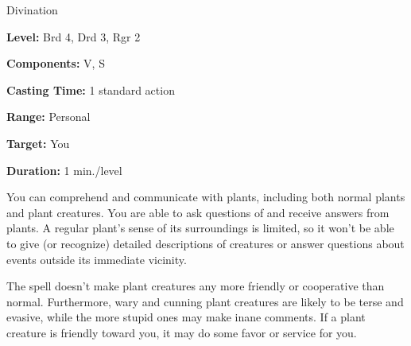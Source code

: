 
Divination

\textbf{Level:} Brd 4, Drd 3, Rgr 2

\textbf{Components:} V, S

\textbf{Casting Time:} 1 standard action

\textbf{Range:} Personal

\textbf{Target:} You

\textbf{Duration:} 1 min./level

You can comprehend and communicate with plants, including both normal plants and 
plant creatures. You are able to ask questions of and receive answers from plants. 
A regular plant's sense of its surroundings is limited, so it won't be able to 
give (or recognize) detailed descriptions of creatures or answer questions about 
events outside its immediate vicinity.

The spell doesn't make plant creatures any more friendly or cooperative than normal. 
Furthermore, wary and cunning plant creatures are likely to be terse and evasive, 
while the more stupid ones may make inane comments. If a plant creature is friendly 
toward you, it may do some favor or service for you.

